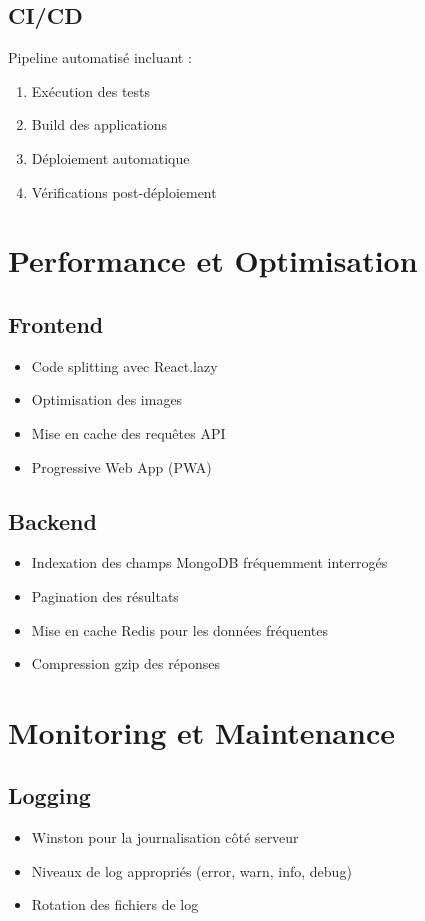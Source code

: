 \documentclass[12pt,a4paper]{article}
\begin{document}
\subsection{CI/CD}
Pipeline automatisé incluant :
\begin{enumerate}
    \item Exécution des tests
    \item Build des applications
    \item Déploiement automatique
    \item Vérifications post-déploiement
\end{enumerate}

\section{Performance et Optimisation}

\subsection{Frontend}
\begin{itemize}
    \item Code splitting avec React.lazy
    \item Optimisation des images
    \item Mise en cache des requêtes API
    \item Progressive Web App (PWA)
\end{itemize}

\subsection{Backend}
\begin{itemize}
    \item Indexation des champs MongoDB fréquemment interrogés
    \item Pagination des résultats
    \item Mise en cache Redis pour les données fréquentes
    \item Compression gzip des réponses
\end{itemize}

\section{Monitoring et Maintenance}

\subsection{Logging}
\begin{itemize}
    \item Winston pour la journalisation côté serveur
    \item Niveaux de log appropriés (error, warn, info, debug)
    \item Rotation des fichiers de log
\end{itemize}
\end{document}
